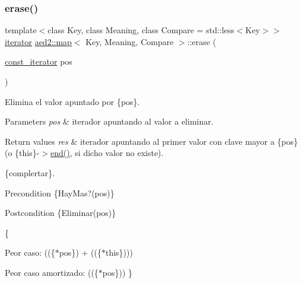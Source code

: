 \subsubsection{\texorpdfstring{erase()}{erase()}\hspace{0.1cm}{\footnotesize\ttfamily [2/2]}}
{\footnotesize\ttfamily template$<$class Key, class Meaning, class Compare = std\+::less$<$\+Key$>$$>$ \\
\hyperlink{classaed2_1_1map_1_1iterator}{iterator} \hyperlink{classaed2_1_1map}{aed2\+::map}$<$ Key, Meaning, Compare $>$\+::erase (\begin{DoxyParamCaption}\item[{\hyperlink{classaed2_1_1map_1_1const__iterator}{const\+\_\+iterator}}]{pos }\end{DoxyParamCaption})\hspace{0.3cm}{\ttfamily [inline]}}



Elimina el valor apuntado por \{pos\}. 


\begin{DoxyParams}{Parameters}
{\em pos} & iterador apuntando al valor a eliminar. \\
\hline
\end{DoxyParams}

\begin{DoxyRetVals}{Return values}
{\em res} & iterador apuntando al primer valor con clave mayor a \{pos\} (o \{this\}-\/$>$\hyperlink{classaed2_1_1map_a76023e6a56cb625513e1b5ea028bf983}{end()}, si dicho valor no existe).\\
\hline
\end{DoxyRetVals}
\{complertar\}.

\begin{DoxyPrecond}{Precondition}
\{Hay\+Mas?(pos)\} 
\end{DoxyPrecond}
\begin{DoxyPostcond}{Postcondition}
\{Eliminar(pos)\}
\end{DoxyPostcond}
\{
\begin{DoxyItemize}
\item Peor caso\+: ((\{$\ast$pos\}) + ((\{$\ast$this\})))
\item Peor caso amortizado\+: ((\{$\ast$pos\})) \} 
\end{DoxyItemize}\mbox{\label{classaed2_1_1map_afd0fc1a8234888e61e0e615de7e245b8}} 
